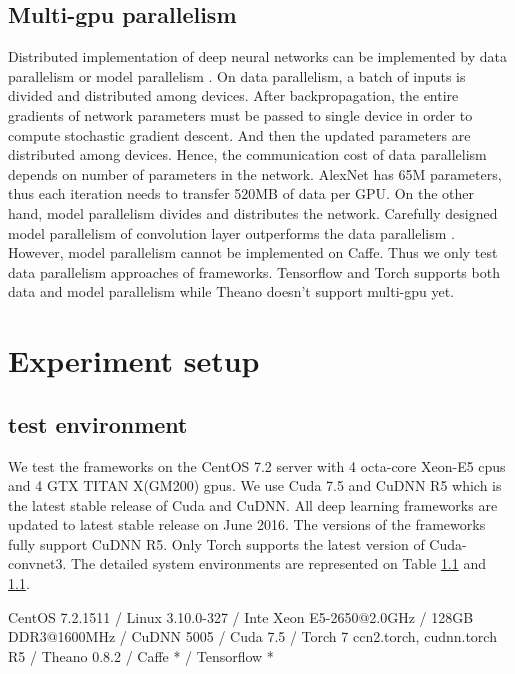 \documentclass[conference]{IEEEtran}
\begin{document}
\subsection{Multi-gpu parallelism}
Distributed implementation of deep neural networks can be implemented by data parallelism or model parallelism \cite{}.
On data parallelism, a batch of inputs is divided and distributed among devices.
After backpropagation, the entire gradients of network parameters must be passed to single device in order to compute stochastic gradient descent.
And then the updated parameters are distributed among devices.
Hence, the communication cost of data parallelism depends on number of parameters in the network.
AlexNet has 65M parameters, thus each iteration needs to transfer 520MB of data per GPU.
On the other hand, model parallelism divides and distributes the network.
Carefully designed model parallelism of convolution layer outperforms the data parallelism \cite{}.
However, model parallelism cannot be implemented on Caffe.
Thus we only test data parallelism approaches of frameworks.
Tensorflow and Torch supports both data and model parallelism while Theano doesn’t support multi-gpu yet.

\section{Experiment setup}

\subsection{test environment}
We test the frameworks on the CentOS 7.2 server with 4 octa-core Xeon-E5 cpus and 4 GTX TITAN X(GM200) gpus.
We use Cuda 7.5 and CuDNN R5 which is the latest stable release of Cuda and CuDNN.
All deep learning frameworks are updated to latest stable release on June 2016.
The versions of the frameworks fully support CuDNN R5.
Only Torch supports the latest version of Cuda-convnet3.
The detailed system environments are represented on Table \ref{} and \ref{}.

CentOS 7.2.1511 / Linux 3.10.0-327 / Inte Xeon E5-2650@2.0GHz / 128GB DDR3@1600MHz / CuDNN 5005 / Cuda 7.5 / Torch 7 ccn2.torch, cudnn.torch R5 / Theano 0.8.2 / Caffe * / Tensorflow *
\end{document}
